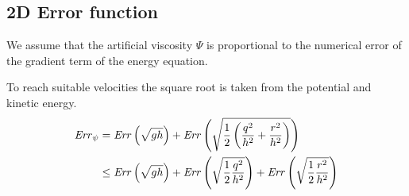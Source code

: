 \subsection{2D Error function} \label{sec:err_psi_2d}
We assume that the artificial viscosity $\Psi$ is proportional to the numerical error of the gradient term of the energy equation.

To reach suitable velocities the square root is taken from the potential and kinetic energy.
\begin{align}
    \mathit{Err}_{\psi} &=
    \mathit{Err} \left( \sqrt{g h} \right)
    + \mathit{Err} \left( \sqrt{ \frac{1}{2} \left( \frac{q^2}{h^2} + \frac{r^2}{h^2} \right) } \right)
    \\
    & \leq
    \mathit{Err} \left( \sqrt{g h} \right)
    + \mathit{Err} \left( \sqrt{ \frac{1}{2} \frac{q^2}{h^2} } \right)
    + \mathit{Err} \left( \sqrt{ \frac{1}{2} \frac{r^2}{h^2} } \right)
\end{align}

